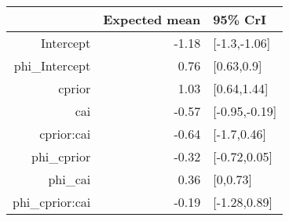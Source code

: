 \begin{tabular}{rrl}
  \hline
 & Expected mean & 95\% CrI \\ 
  \hline
Intercept & -1.18 & [-1.3,-1.06] \\ 
  phi\_Intercept & 0.76 & [0.63,0.9] \\ 
  cprior & 1.03 & [0.64,1.44] \\ 
  cai & -0.57 & [-0.95,-0.19] \\ 
  cprior:cai & -0.64 & [-1.7,0.46] \\ 
  phi\_cprior & -0.32 & [-0.72,0.05] \\ 
  phi\_cai & 0.36 & [0,0.73] \\ 
  phi\_cprior:cai & -0.19 & [-1.28,0.89] \\ 
   \hline
\end{tabular}


